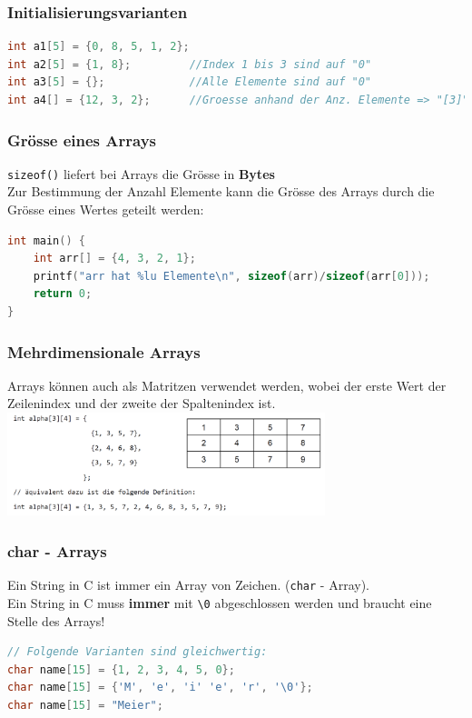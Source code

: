 		\subsubsection{Initialisierungsvarianten}
			\begin{lstlisting}[language=C]
int a1[5] = {0, 8, 5, 1, 2};
int a2[5] = {1, 8};         //Index 1 bis 3 sind auf "0"
int a3[5] = {};             //Alle Elemente sind auf "0"
int a4[] = {12, 3, 2};      //Groesse anhand der Anz. Elemente => "[3]"
			\end{lstlisting}

		\subsubsection{Grösse eines Arrays}
			\verb|sizeof()| liefert bei Arrays die Grösse in \textbf{Bytes}\\
			Zur Bestimmung der Anzahl Elemente kann die Grösse des Arrays durch die Grösse eines Wertes geteilt werden:
			\begin{lstlisting}[language=C]
int main() {
	int arr[] = {4, 3, 2, 1};
	printf("arr hat %lu Elemente\n", sizeof(arr)/sizeof(arr[0]));
	return 0;
}
			\end{lstlisting}

		\subsubsection{Mehrdimensionale Arrays}
			Arrays können auch als Matritzen verwendet werden, wobei der erste Wert der Zeilenindex und der zweite der Spaltenindex ist.\\
			\includegraphics[height=3cm]{Bilder/arr_mehrdimensional.png}

		\subsubsection{char - Arrays}
			Ein String in C ist immer ein Array von Zeichen. (\verb|char| - Array).\\
			Ein String in C muss \textbf{immer} mit \verb|\0| abgeschlossen werden und braucht eine Stelle des Arrays!
			\begin{lstlisting}[language=C]
// Folgende Varianten sind gleichwertig:
char name[15] = {1, 2, 3, 4, 5, 0};
char name[15] = {'M', 'e', 'i' 'e', 'r', '\0'};
char name[15] = "Meier";
			\end{lstlisting}

